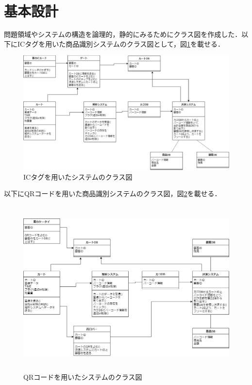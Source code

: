 


\section{基本設計}

問題領域やシステムの構造を論理的，静的にみるためにクラス図を作成した．以下にICタグを用いた商品識別システムのクラス図として，図\ref{class_ic}を載せる．

\begin{figure}[htbp]
\centering
\includegraphics[width=15cm]{./picture/class_ic.eps}
\caption{ICタグを用いたシステムのクラス図}
\label{class_ic}
\end{figure}


以下にQRコードを用いた商品識別システムのクラス図，図\ref{class_qr}を載せる．


\begin{figure}[htbp]
\centering
\includegraphics[height = 9cm,width=15cm]{./picture/class_qr.eps}
\caption{QRコードを用いたシステムのクラス図}
\label{class_qr}
\end{figure}


